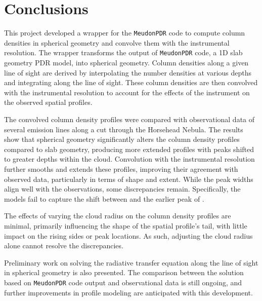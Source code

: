 \documentclass[12pt,a4paper]{article}
\newcommand{\mdpdr}{\texttt{MeudonPDR} code}
\begin{document}

\section{Conclusions} \label{sec:conclusion}

This project developed a wrapper for the \mdpdr{} to compute column densities in spherical geometry and convolve them with the instrumental resolution. The wrapper transforms the output of \mdpdr{}, a 1D slab geometry PDR model, into spherical geometry. Column densities along a given line of sight are derived by interpolating the number densities at various depths and integrating along the line of sight. These column densities are then convolved with the instrumental resolution to account for the effects of the instrument on the observed spatial profiles. 

The convolved column density profiles were compared with observational data of several emission lines along a cut through the Horsehead Nebula. The results show that spherical geometry significantly alters the column density profiles compared to slab geometry, producing more extended profiles with peaks shifted to greater depths within the cloud. Convolution with the instrumental resolution further smooths and extends these profiles, improving their agreement with observed data, particularly in terms of shape and extent. While the peak widths align well with the observations, some discrepancies remain. Specifically, the models fail to capture the shift between  and the earlier peak of .

The effects of varying the cloud radius on the column density profiles are minimal, primarily influencing the shape of the spatial profile's tail, with little impact on the rising sides or peak locations. As such, adjusting the cloud radius alone cannot resolve the discrepancies.

Preliminary work on solving the radiative transfer equation along the line of sight in spherical geometry is also presented. The comparison between the solution based on \mdpdr{} output and observational data is still ongoing, and further improvements in profile modeling are anticipated with this development.
\end{document}
